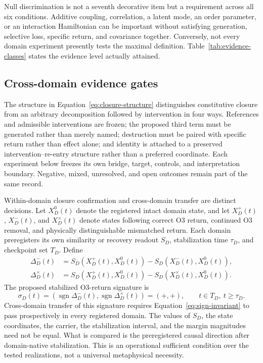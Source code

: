 \documentclass[11pt,a4paper]{article}
\begin{document}
Null discrimination is not a seventh decorative item but a requirement across all six conditions. Additive coupling, correlation, a latent mode, an order parameter, or an interaction Hamiltonian can be important without satisfying generation, selective loss, specific return, and covariance together. Conversely, not every domain experiment presently tests the maximal definition. Table~\ref{tab:evidence-classes} states the evidence level actually attained.

\subsection{Cross-domain evidence gates}

The structure in Equation~\eqref{eq:closure-structure} distinguishes constitutive closure from an arbitrary decomposition followed by intervention in four ways. References and admissible interventions are frozen; the proposed third term must be generated rather than merely named; destruction must be paired with specific return rather than effect alone; and identity is attached to a preserved intervention--re-entry structure rather than a preferred coordinate. Each experiment below freezes its own bridge, target, controls, and interpretation boundary. Negative, mixed, unresolved, and open outcomes remain part of the same record.

Within-domain closure confirmation and cross-domain transfer are distinct decisions. Let $X_D^0(t)$ denote the registered intact domain state, and let $X_D^{+}(t)$, $X_D^{-}(t)$, and $X_D^{\times}(t)$ denote states following correct O3 return, continued O3 removal, and physically distinguishable mismatched return. Each domain preregisters its own similarity or recovery readout $S_D$, stabilization time $\tau_D$, and checkpoint set $T_D$. Define
\begin{align}
 \Delta_D^{-}(t)
 &=S_D\!\left(X_D^{+}(t),X_D^0(t)\right)
   -S_D\!\left(X_D^{-}(t),X_D^0(t)\right),\\
 \Delta_D^{\times}(t)
 &=S_D\!\left(X_D^{+}(t),X_D^0(t)\right)
   -S_D\!\left(X_D^{\times}(t),X_D^0(t)\right).
 \label{eq:stabilized-margins}
\end{align}
The proposed stabilized O3-return signature is
\begin{equation}
 \sigma_D(t)=
 \left(\operatorname{sgn}\Delta_D^{-}(t),
       \operatorname{sgn}\Delta_D^{\times}(t)\right)=(+,+),
 \qquad t\in T_D,\ t\geq\tau_D.
 \label{eq:sign-invariant}
\end{equation}
Cross-domain transfer of this signature requires Equation~\eqref{eq:sign-invariant} to pass prospectively in every registered domain. The values of $S_D$, the state coordinates, the carrier, the stabilization interval, and the margin magnitudes need not be equal. What is compared is the preregistered causal direction after domain-native stabilization. This is an operational sufficient condition over the tested realizations, not a universal metaphysical necessity.
\end{document}
